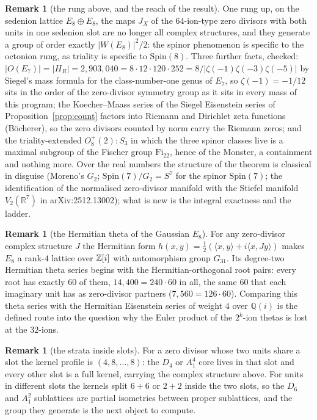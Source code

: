 \documentclass[11pt]{amsart}
\theoremstyle{definition}
\newtheorem{remark}[theorem]{Remark}
\begin{document}
\begin{remark}[the rung above, and the reach of the result]
One rung up, on the sedenion lattice $E_8\oplus E_8$, the maps $J_X$ of the $64$-ion-type zero divisors with both units in one sedenion slot are no longer all complex structures, and they generate a group of order exactly $|W(E_8)|^2/2$: the spinor phenomenon is specific to the octonion rung, as triality is specific to $\mathrm{Spin}(8)$. Three further facts, checked: $|O(E_7)|=|H_R|=2{,}903{,}040=8\cdot12\cdot120\cdot252=8/|\zeta(-1)\zeta(-3)\zeta(-5)|$ by Siegel's mass formula for the class-number-one genus of $E_7$, so $\zeta(-1)=-1/12$ sits in the order of the zero-divisor symmetry group as it sits in every mass of this program; the Koecher--Maass series of the Siegel Eisenstein series of Proposition~\ref{prop:count} factors into Riemann and Dirichlet zeta functions (B\"ocherer), so the zero divisors counted by norm carry the Riemann zeros; and the triality-extended $O_8^+(2){:}S_3$ in which the three spinor classes live is a maximal subgroup of the Fischer group $\mathrm{Fi}_{22}$, hence of the Monster, a containment and nothing more. Over the real numbers the structure of the theorem is classical in disguise (Moreno's $G_2$; $\mathrm{Spin}(7)/G_2=S^7$ for the spinor $\mathrm{Spin}(7)$; the identification of the normalised zero-divisor manifold with the Stiefel manifold $V_2(\mathbb R^7)$ in arXiv:2512.13002); what is new is the integral exactness and the ladder.
\end{remark}
\begin{remark}[the Hermitian theta of the Gaussian $E_8$]
For any zero-divisor complex structure $J$ the Hermitian form $h(x,y)=\tfrac12(\langle x,y\rangle+i\langle x,Jy\rangle)$ makes $E_8$ a rank-$4$ lattice over $\mathbb{Z}[i]$ with automorphism group $G_{31}$. Its degree-two Hermitian theta series begins with the Hermitian-orthogonal root pairs: every root has exactly $60$ of them, $14{,}400=240\cdot60$ in all, the same $60$ that each imaginary unit has as zero-divisor partners ($7{,}560=126\cdot60$). Comparing this theta series with the Hermitian Eisenstein series of weight $4$ over $\mathbb Q(i)$ is the defined route into the question why the Euler product of the $2^k$-ion thetas is lost at the $32$-ions.
\end{remark}
\begin{remark}[the strata inside slots]
For a zero divisor whose two units share a slot the kernel profile is $(4,8,\dots,8)$: the $D_4$ or $A_1^4$ core lives in that slot and every other slot is a full kernel, carrying the complex structure above. For units in different slots the kernels split $6+6$ or $2+2$ inside the two slots, so the $D_6$ and $A_1^2$ sublattices are partial isometries between proper sublattices, and the group they generate is the next object to compute.
\end{remark}
\end{document}
